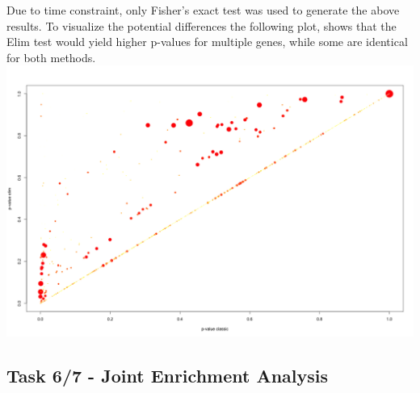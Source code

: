 \documentclass[
]{article}
\begin{document}
Due to time constraint, only Fisher's exact test was used to generate
the above results. To visualize the potential differences the following
plot, shows that the Elim test would yield higher p-values for multiple
genes, while some are identical for both methods.
\includegraphics{../../plots/SRP164913_topGO_fisher_vs_elim.png}

\subsection{Task 6/7 - Joint Enrichment
Analysis}\label{task-67---joint-enrichment-analysis}
\end{document}
